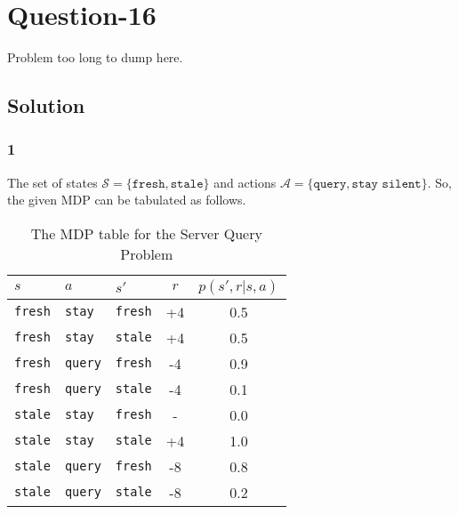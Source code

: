 \documentclass[11pt]{article}
\begin{document}
    \section*{Question-16}
    Problem too long to dump here.

    \subsection*{Solution}
    \subsubsection*{1}
    The set of states $\mathcal{S} = \{ \texttt{fresh}, \texttt{stale} \}$ and actions
    $\mathcal{A} = \{ \texttt{query}, \texttt{stay silent} \}$. So, the given MDP can be tabulated as follows.
    \begin{table}[ht]
        \centering
        \renewcommand{\arraystretch}{1.25}
        \begin{tabular}{lllc|c}
            $s$ & $a$ & $s'$ & $r$ & $p(s', r | s, a)$ \\
            \hline
            \texttt{fresh} & \texttt{stay} & \texttt{fresh} & +4 & 0.5  \\
            \texttt{fresh} & \texttt{stay} & \texttt{stale} & +4 & 0.5 \\
            \texttt{fresh} & \texttt{query} & \texttt{fresh} & -4 & 0.9 \\
            \texttt{fresh} & \texttt{query} & \texttt{stale} & -4 & 0.1 \\
            \texttt{stale} & \texttt{stay} & \texttt{fresh} & - & 0.0 \\
            \texttt{stale} & \texttt{stay} & \texttt{stale} & +4 & 1.0 \\
            \texttt{stale} & \texttt{query} & \texttt{fresh} & -8 & 0.8 \\
            \texttt{stale} & \texttt{query} & \texttt{stale} & -8 & 0.2 \\
        \end{tabular}
        \caption{The MDP table for the Server Query Problem}
        \label{tab:mdp-query-server}
    \end{table}
\end{document}

